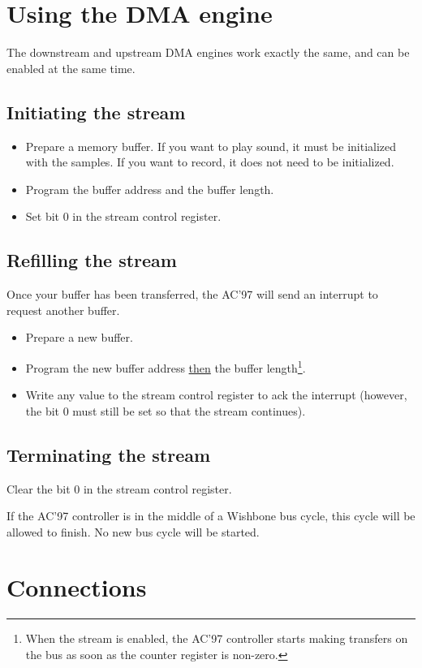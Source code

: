 \documentclass[a4paper,11pt]{article}
\begin{document}
\section{Using the DMA engine}
The downstream and upstream DMA engines work exactly the same, and can be enabled at the same time.

\subsection{Initiating the stream}
\begin{itemize}
\item Prepare a memory buffer. If you want to play sound, it must be initialized with the samples. If you want to record, it does not need to be initialized.
\item Program the buffer address and the buffer length.
\item Set bit 0 in the stream control register.
\end{itemize}

\subsection{Refilling the stream}
Once your buffer has been transferred, the AC'97 will send an interrupt to request another buffer.
\begin{itemize}
\item Prepare a new buffer.
\item Program the new buffer address \underline{then} the buffer length\footnote{When the stream is enabled, the AC'97 controller starts making transfers on the bus as soon as the counter register is non-zero.}.
\item Write any value to the stream control register to ack the interrupt (however, the bit 0 must still be set so that the stream continues).
\end{itemize}

\subsection{Terminating the stream}
Clear the bit 0 in the stream control register.

If the AC'97 controller is in the middle of a Wishbone bus cycle, this cycle will be allowed to finish. No new bus cycle will be started.

\section{Connections}
\end{document}
